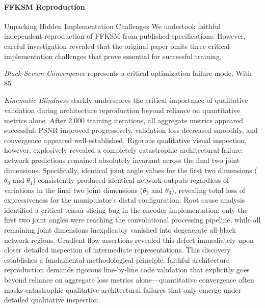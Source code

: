 ﻿\documentclass[11pt,a4paper]{article}
\begin{document}
\paragraph{FFKSM Reproduction} Unpacking Hidden Implementation Challenges
We undertook faithful independent reproduction of FFKSM from published specifications. However, careful investigation revealed that the original paper omits three critical implementation challenges that prove essential for successful training.

\emph{Black Screen Convergence} represents a critical optimization failure mode. With 85%

\emph{Kinematic Blindness} starkly underscores the critical importance of qualitative validation during architecture reproduction beyond reliance on quantitative metrics alone. After 2,000 training iterations, all aggregate metrics appeared successful: PSNR improved progressively, validation loss decreased smoothly, and convergence appeared well-established. Rigorous qualitative visual inspection, however, explosively revealed a completely catastrophic architectural failure: network predictions remained absolutely invariant across the final two joint dimensions. Specifically, identical joint angle values for the first two dimensions ($\theta_0$ and $\theta_1$) consistently produced identical network outputs regardless of variations in the final two joint dimensions ($\theta_2$ and $\theta_3$), revealing total loss of expressiveness for the manipulator's distal configuration. Root cause analysis identified a critical tensor slicing bug in the encoder implementation: only the first two joint angles were reaching the convolutional processing pipeline, while all remaining joint dimensions inexplicably vanished into degenerate all-black network regions. Gradient flow assertions revealed this defect immediately upon closer detailed inspection of intermediate representations. This discovery establishes a fundamental methodological principle: faithful architecture reproduction demands rigorous line-by-line code validation that explicitly goes beyond reliance on aggregate loss metrics alone—quantitative convergence often masks catastrophic qualitative architectural failures that only emerge under detailed qualitative inspection.
\end{document}
